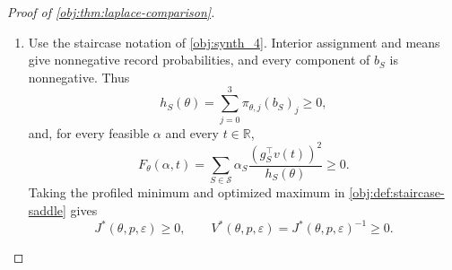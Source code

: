 \documentclass[11pt]{article}
\begin{document}
\begin{proof}[Proof of \cref{obj:thm:laplace-comparison}]
\begin{enumerate}
The Laplace density is
\[
f_{\mathrm{Lap}}(\ell)
=
\frac{1}{2b_{\mathrm{Lap}}}
\exp\!\left(-\frac{|\ell|}{b_{\mathrm{Lap}}}\right),
\qquad \ell\in\mathbb R.
\]
Its symmetry gives \(\mathbb E[L_i]=0\). The gamma integral at shape three gives
\[
\int_0^\infty
\ell^2e^{-\ell/b_{\mathrm{Lap}}}\,d\ell
=
2b_{\mathrm{Lap}}^3,
\]
and hence
\[
\mathbb E[L_i^2]
=
\frac{1}{b_{\mathrm{Lap}}}
\int_0^\infty
\ell^2e^{-\ell/b_{\mathrm{Lap}}}\,d\ell
=
2b_{\mathrm{Lap}}^2
=
\frac{2\Delta_A^2}{\varepsilon^2}.
\]
Since \(A_{\mathrm{trial},i}\) is a function of \(X_i\), its independence from \(L_i\) yields
\[
\mathbb E[L_iA_{\mathrm{trial},i}]
=
\mathbb E[L_i]\mathbb E[A_{\mathrm{trial},i}]
=0.
\]
For the releases of \cref{obj:def:oa-release}, it follows that
\[
\mathbb E[\widetilde A_i]=\tau,
\qquad
\mathbb E[\widetilde A_i^2]
=
\frac{\mu_1}{p}+\frac{\mu_0}{q}
+\frac{2\Delta_A^2}{\varepsilon^2}.
\]
Define their centered versions by
\[
\xi_{\mathrm{OA},i}=\widetilde A_i-\tau.
\]
Expanding the centered square gives
\[
\mathbb E[\xi_{\mathrm{OA},i}]=0,
\qquad
\mathbb E[\xi_{\mathrm{OA},i}^2]
=
\mathbb E[\widetilde A_i^2]
-2\tau\mathbb E[\widetilde A_i]+\tau^2
=
V_{\mathrm{OA}}(\theta,p,\varepsilon)<\infty.
\]

The pairs \((X_i,L_i)\) are independent across subjects. Each pair has the same product law, because the record law and the noise law are common across subjects and its two coordinates are independent. Applying the release function to each pair shows that the centered releases are independent and identically distributed. The iid central limit theorem therefore gives
\[
\frac{1}{\sqrt n}\sum_{i=1}^n\xi_{\mathrm{OA},i}
\rightsquigarrow
N\!\left(0,V_{\mathrm{OA}}(\theta,p,\varepsilon)\right).
\]
For every \(n\ge1\),
\[
\frac{1}{\sqrt n}\sum_{i=1}^n\xi_{\mathrm{OA},i}
=
\sqrt n(\widehat\tau_{\mathrm{OA}}-\tau).
\]
At \(n=0\), both normalized expressions are zero under the stated conventions. This proves the asserted convergence in law.

\item Use the staircase notation of \cref{obj:synth_4}. Interior assignment and means give nonnegative record probabilities, and every component of \(b_S\) is nonnegative. Thus
\[
h_S(\theta)
=
\sum_{j=0}^3\pi_{\theta,j}(b_S)_j\ge0,
\]
and, for every feasible \(\alpha\) and every \(t\in\mathbb R\),
\[
F_\theta(\alpha,t)
=
\sum_{S\in\mathcal S}
\alpha_S\frac{(g_S^\top v(t))^2}{h_S(\theta)}
\ge0.
\]
Taking the profiled minimum and optimized maximum in
\cref{obj:def:staircase-saddle} gives
\[
J^*(\theta,p,\varepsilon)\ge0,
\qquad
V^*(\theta,p,\varepsilon)=J^*(\theta,p,\varepsilon)^{-1}\ge0.
\]


\end{enumerate}
\end{proof}
\end{document}
